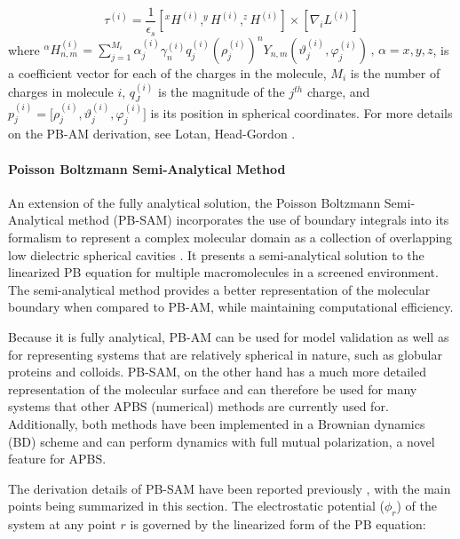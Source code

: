 \documentclass[journal=jpcbfk, manuscript=article]{achemso}
\begin{document}
%
\begin{equation}\label{eq:pbamtor}
	\tau^{(i)} =  \frac{1}{\epsilon_s}\left [  ^xH^{(i)}, ^yH^{(i)}, ^zH^{(i)} \right] \times   \left [  \nabla_i L^{(i)} \right ]
\end{equation} 
%
where $^\alpha H_{n,m}^{(i)}  = \sum_{j=1}^{M_i} \alpha_{j}^{(i)} \gamma_n^{(i)} q_j^{(i)} (\rho_j^{(i)})^n Y_{n,m} (\vartheta_j^{(i)}, \varphi_j^{(i)}) \, , \, \alpha = x , y, z$, is a coefficient vector for each of the charges in the molecule, $M_i$ is the number of charges in molecule $i$, $q_J^{(i)}$ is the magnitude of the $j^{th}$ charge, and $p_j^{(i)}=\Big[\rho_j^{(i)},\vartheta_j^{(i)},\varphi_j^{(i)}\Big]$ is its position in spherical coordinates. For more details on the PB-AM derivation, see Lotan, Head-Gordon \cite{lotan2006}.

\paragraph{Poisson Boltzmann Semi-Analytical Method}

An extension of the fully analytical solution, the Poisson Boltzmann Semi-Analytical method (PB-SAM) incorporates the use of boundary integrals into its formalism to represent a complex molecular domain as a collection of overlapping low dielectric spherical cavities \cite{yap2010}.  It presents a semi-analytical solution to the linearized PB equation for multiple macromolecules in a screened environment. The semi-analytical method provides a better representation of the molecular boundary when compared to PB-AM, while maintaining computational efficiency.

Because it is fully analytical, PB-AM can be used for model validation as well as for representing systems that are relatively spherical in nature, such as globular proteins and colloids. PB-SAM, on the other hand has a much more detailed representation of the molecular surface and can therefore be used for many systems that other APBS (numerical) methods are currently used for. Additionally, both methods have been implemented in a Brownian dynamics (BD) scheme \cite{ermak1978} and can perform dynamics with full mutual polarization, a novel feature for APBS.

The derivation details of PB-SAM have been reported  previously \cite{yap2010,yap2013}, with the main points being summarized in this section. The electrostatic potential ($\phi_r$) of the system at any point $r$ is governed by the linearized form of the PB equation:
\end{document}
